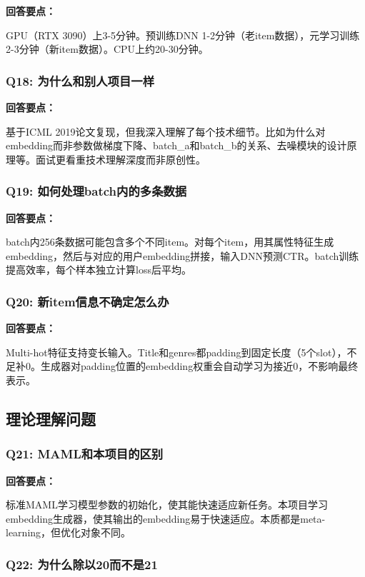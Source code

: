 \documentclass[12pt,a4paper]{article}
\begin{document}
\textbf{回答要点：}

GPU（RTX 3090）上3-5分钟。预训练DNN 1-2分钟（老item数据），元学习训练2-3分钟（新item数据）。CPU上约20-30分钟。

\subsubsection{Q18: 为什么和别人项目一样}

\textbf{回答要点：}

基于ICML 2019论文复现，但我深入理解了每个技术细节。比如为什么对embedding而非参数做梯度下降、batch\_a和batch\_b的关系、去噪模块的设计原理等。面试更看重技术理解深度而非原创性。

\subsubsection{Q19: 如何处理batch内的多条数据}

\textbf{回答要点：}

batch内256条数据可能包含多个不同item。对每个item，用其属性特征生成embedding，然后与对应的用户embedding拼接，输入DNN预测CTR。batch训练提高效率，每个样本独立计算loss后平均。

\subsubsection{Q20: 新item信息不确定怎么办}

\textbf{回答要点：}

Multi-hot特征支持变长输入。Title和genres都padding到固定长度（5个slot），不足补0。生成器对padding位置的embedding权重会自动学习为接近0，不影响最终表示。

\subsection{理论理解问题}

\subsubsection{Q21: MAML和本项目的区别}

\textbf{回答要点：}

标准MAML学习模型参数的初始化，使其能快速适应新任务。本项目学习embedding生成器，使其输出的embedding易于快速适应。本质都是meta-learning，但优化对象不同。

\subsubsection{Q22: 为什么除以20而不是21}
\end{document}
